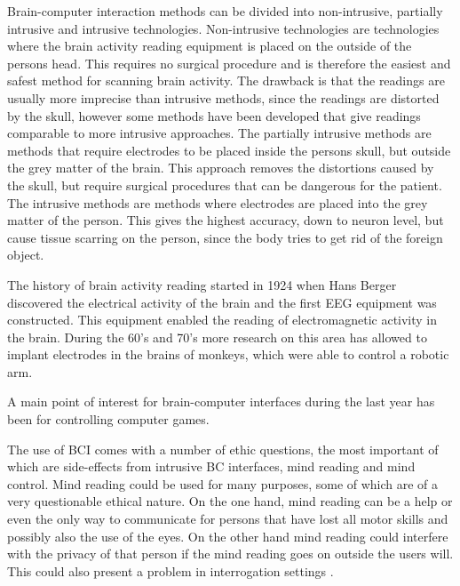 Brain-computer interaction methods can be divided into non-intrusive, partially intrusive and intrusive technologies. Non-intrusive technologies are technologies where the brain activity reading equipment is placed on the outside of the persons head. This requires no surgical procedure and is therefore the easiest and safest method for scanning brain activity. The drawback is that the readings are usually more imprecise than intrusive methods, since the readings are distorted by the skull, however some \cite{doud2011continuous} methods have been developed that give readings comparable to more intrusive approaches.
The partially intrusive methods are methods that require electrodes to be placed inside the persons skull, but outside the grey matter of the brain. This approach removes the distortions caused by the skull, but require surgical procedures that can be dangerous for the patient. The intrusive methods are methods where electrodes are placed into the grey matter of the person. This gives the highest accuracy, down to neuron level, but cause tissue scarring on the person, since the body tries to get rid of the foreign object.

The history of brain activity reading started in 1924 when Hans Berger discovered the electrical activity of the brain and the first EEG equipment was constructed. This equipment enabled the reading of electromagnetic activity in the brain. During the 60's and 70's more research on this area has allowed  to implant electrodes in the brains of monkeys, which were able to control a robotic arm\cite{GeorgopoulosLuritoPetridesEtAl89}.


A main point of interest for brain-computer interfaces during the last year has been for controlling computer games\cite{conf/icec/GurkokNP12}.


The use of BCI comes with a number of ethic questions, the most important of which are side-effects from intrusive BC interfaces, mind reading and mind control.
Mind reading could be used for many purposes, some of which are of a very questionable ethical nature. On the one hand, mind reading can be a help or even the only way to communicate for persons that have lost all motor skills and possibly also the use of the eyes. On the other hand mind reading could interfere with the privacy of that person if the mind reading goes on outside the users will. This could also present a problem in interrogation settings .
